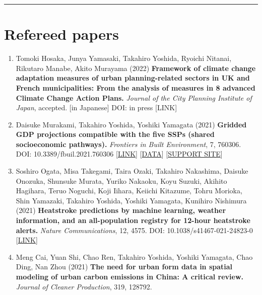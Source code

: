 \documentclass[]{book}
\providecommand{\tightlist}{%
  \setlength{\itemsep}{0pt}\setlength{\parskip}{0pt}}
\begin{document}
\begin{center}\rule{0.5\linewidth}{0.5pt}\end{center}

\hypertarget{refereed-papers}{%
\section*{Refereed papers}\label{refereed-papers}}

\begin{enumerate}
\def\labelenumi{\arabic{enumi}.}
\tightlist
\item
  Tomoki Hosaka, Junya Yamasaki, Takahiro Yoshida, Ryoichi Nitanai, Rikutaro Manabe, Akito Murayama (2022)
  \textbf{Framework of climate change adaptation measures of urban planning-related sectors in UK and French municipalities: From the analysis of measures in 8 advanced Climate Change Action Plans.}
  \emph{Journal of the City Planning Institute of Japan}, accepted. {[}in Japanese{]}
  DOI: in press {[}LINK{]}
\item
  Daisuke Murakami, Takahiro Yoshida, Yoshiki Yamagata (2021)
  \textbf{Gridded GDP projections compatible with the five SSPs (shared socioeconomic pathways).}
  \emph{Frontiers in Built Environment}, 7, 760306.
  DOI: 10.3389/fbuil.2021.760306 {[}\href{https://www.frontiersin.org/articles/10.3389/fbuil.2021.760306/abstract}{LINK}{]} {[}\href{https://figshare.com/articles/dataset/Gridded_GDP_projections_compatible_with_the_five_SSPs_Shared_Socioeconomic_Pathways_/12016506/1}{DATA}{]}
  {[}\href{https://gcp-tsukuba.github.io/SSP-downscale/}{SUPPORT SITE}{]}
\item
  Soshiro Ogata, Misa Takegami, Taira Ozaki, Takahiro Nakashima, Daisuke Onozuka, Shunsuke Murata, Yuriko Nakaoku, Koyu Suzuki, Akihito Hagihara, Teruo Noguchi, Koji Iihara, Keiichi Kitazume, Tohru Morioka, Shin Yamazaki, Takahiro Yoshida, Yoshiki Yamagata, Kunihiro Nishimura (2021)
  \textbf{Heatstroke predictions by machine learning, weather information, and an all-population registry for 12-hour heatstroke alerts.}
  \emph{Nature Communications}, 12, 4575.
  DOI: 10.1038/s41467-021-24823-0 {[}\href{https://www.nature.com/articles/s41467-021-24823-0}{LINK}{]}
\item
  Meng Cai, Yuan Shi, Chao Ren, Takahiro Yoshida, Yoshiki Yamagata, Chao Ding, Nan Zhou (2021)
  \textbf{The need for urban form data in spatial modeling of urban carbon emissions in China: A critical review.}
  \emph{Journal of Cleaner Production}, 319, 128792.

\end{enumerate}
\end{document}
